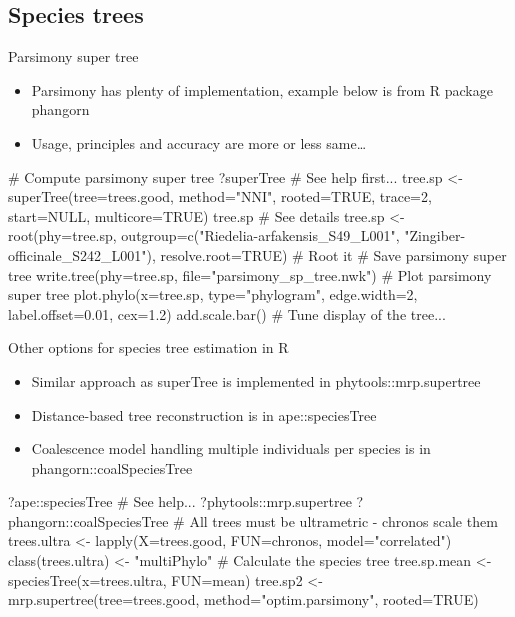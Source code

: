 \documentclass[compress,  xelatex, 11pt, xcolor=x11names, aspectratio=169,
	hyperref={
		bookmarks=true,
		unicode=true,
		colorlinks=true,
		pdftitle={HybSeq course},
		plainpages=false,
		pdfauthor={Vojtech Zeisek},
		pdfsubject={Practical processing of HybSeq target enrichment sequencing data on computing grids like MetaCentrum},
		pdfcreator={XeLaTeX},
		pdfkeywords={BASH, command line, GNU, HybSeq, Linux, MetaCentrum, sequencing shell, target enrichment},
		linkcolor=Turquoise4, %
		anchorcolor=DodgerBlue4, %
		citecolor=DodgerBlue4, %
		filecolor=DodgerBlue4, %
		menucolor=Tan4, %
		urlcolor=DarkOliveGreen4 %
		},
	url={hyphens, lowtilde} %
	]{beamer}
\renewcommand{\texttt}[1]{\colorbox{Cornsilk2}{{\ttfamily #1}}}
\begin{document}
\subsection{Species trees}

\begin{frame}[fragile]{Parsimony super tree}
	\begin{itemize}
		\item Parsimony has plenty of implementation, example below is from \texttt{R} package \texttt{phangorn}
		\item Usage, principles and accuracy are more or less same\ldots
	\end{itemize}
	\begin{spluscode}
    # Compute parsimony super tree
    ?superTree # See help first...
    tree.sp <- superTree(tree=trees.good, method="NNI", rooted=TRUE,
      trace=2, start=NULL, multicore=TRUE)
    tree.sp # See details
    tree.sp <- root(phy=tree.sp, outgroup=c("Riedelia-arfakensis_S49_L001",
      "Zingiber-officinale_S242_L001"), resolve.root=TRUE) # Root it
    # Save parsimony super tree
    write.tree(phy=tree.sp, file="parsimony_sp_tree.nwk")
    # Plot parsimony super tree
    plot.phylo(x=tree.sp, type="phylogram", edge.width=2,
      label.offset=0.01, cex=1.2)
    add.scale.bar()
    # Tune display of the tree...
	\end{spluscode}
\end{frame}

\begin{frame}[fragile]{Other options for species tree estimation in R}
	\begin{itemize}
		\item Similar approach as \texttt{superTree} is implemented in \texttt{phytools::mrp.supertree}
		\item Distance-based tree reconstruction is in \texttt{ape::speciesTree}
		\item Coalescence model handling multiple individuals per species is in \texttt{phangorn::coalSpeciesTree}
	\end{itemize}
	\begin{spluscode}
    ?ape::speciesTree # See help...
    ?phytools::mrp.supertree
    ?phangorn::coalSpeciesTree
    # All trees must be ultrametric - chronos scale them
    trees.ultra <- lapply(X=trees.good, FUN=chronos, model="correlated")
    class(trees.ultra) <- "multiPhylo"
    # Calculate the species tree
    tree.sp.mean <- speciesTree(x=trees.ultra, FUN=mean)
    tree.sp2 <- mrp.supertree(tree=trees.good, method="optim.parsimony",
      rooted=TRUE)
	\end{spluscode}
\end{frame}
\end{document}

